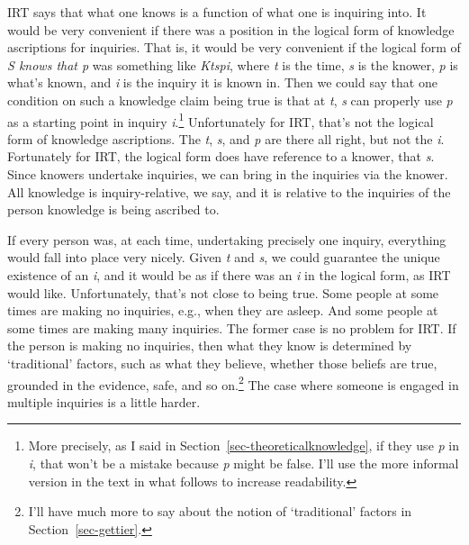 \documentclass[
  12pt,
  letterpaper,
]{scrbook}
\begin{document}
IRT says that what one knows is a function of what one is inquiring
into. It would be very convenient if there was a position in the logical
form of knowledge ascriptions for inquiries. That is, it would be very
convenient if the logical form of \emph{S knows that p} was something
like \emph{Ktspi}, where \emph{t} is the time, \emph{s} is the knower,
\emph{p} is what's known, and \emph{i} is the inquiry it is known in.
Then we could say that one condition on such a knowledge claim being
true is that at \emph{t}, \emph{s} can properly use \emph{p} as a
starting point in inquiry \emph{i}.\footnote{More precisely, as I said
  in Section~\ref{sec-theoreticalknowledge}, if they use \emph{p} in
  \emph{i}, that won't be a mistake because \emph{p} might be false.
  I'll use the more informal version in the text in what follows to
  increase readability.} Unfortunately for IRT, that's not the logical
form of knowledge ascriptions. The \emph{t}, \emph{s}, and \emph{p} are
there all right, but not the \emph{i}. Fortunately for IRT, the logical
form does have reference to a knower, that \emph{s}. Since knowers
undertake inquiries, we can bring in the inquiries via the knower. All
knowledge is inquiry-relative, we say, and it is relative to the
inquiries of the person knowledge is being ascribed to.

If every person was, at each time, undertaking precisely one inquiry,
everything would fall into place very nicely. Given \emph{t} and
\emph{s}, we could guarantee the unique existence of an \emph{i}, and it
would be as if there was an \emph{i} in the logical form, as IRT would
like. Unfortunately, that's not close to being true. Some people at some
times are making no inquiries, e.g., when they are asleep. And some
people at some times are making many inquiries. The former case is no
problem for IRT. If the person is making no inquiries, then what they
know is determined by `traditional' factors, such as what they believe,
whether those beliefs are true, grounded in the evidence, safe, and so
on.\footnote{I'll have much more to say about the notion of
  `traditional' factors in Section~\ref{sec-gettier}.} The case where
someone is engaged in multiple inquiries is a little harder.
\end{document}
